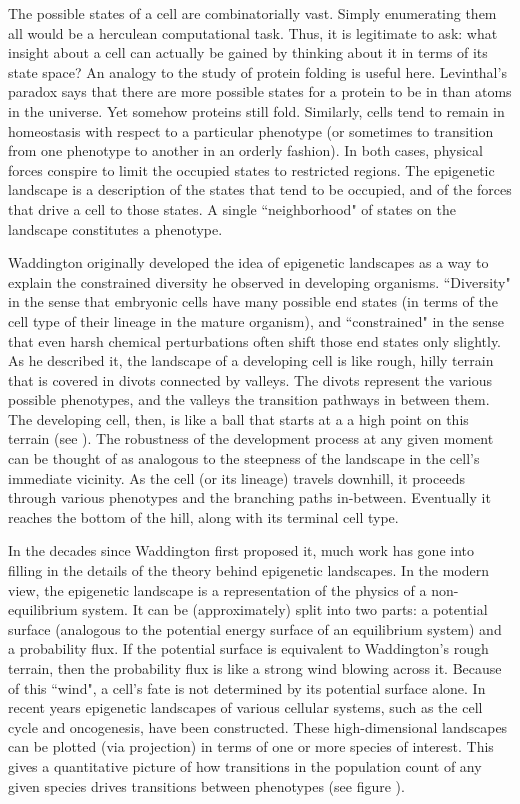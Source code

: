 The possible states of a cell are combinatorially vast. Simply enumerating them all would be a herculean computational task. Thus, it is legitimate to ask: what insight about a cell can actually be gained by thinking about it in terms of its state space? An analogy to the study of protein folding is useful here. Levinthal's paradox\cite{Levinthal:1969uy} says that there are more possible states for a protein to be in than atoms in the universe. Yet somehow proteins still fold. Similarly, cells tend to remain in homeostasis with respect to a particular phenotype (or sometimes to transition from one phenotype to another in an orderly fashion). In both cases, physical forces conspire to limit the occupied states to restricted regions. The epigenetic landscape is a description of the states that tend to be occupied, and of the forces that drive a cell to those states. A single ``neighborhood" of states on the landscape constitutes a phenotype.

Waddington originally developed the idea of epigenetic landscapes as a way to explain the constrained diversity he observed in developing organisms. ``Diversity" in the sense that embryonic cells have many possible end states (in terms of the cell type of their lineage in the mature organism), and ``constrained" in the sense that even harsh chemical perturbations often shift those end states only slightly. As he described it, the landscape of a developing cell is like rough, hilly terrain that is covered in divots connected by valleys. The divots represent the various possible phenotypes, and the valleys the transition pathways in between them. The developing cell, then, is like a ball that starts at a a high point on this terrain (see ). The robustness of the development process at any given moment can be thought of as analogous to the steepness of the landscape in the cell's immediate vicinity. As the cell (or its lineage) travels downhill, it proceeds through various phenotypes and the branching paths in-between. Eventually it reaches the bottom of the hill, along with its terminal cell type.

In the decades since Waddington first proposed it, much work has gone into filling in the details of the theory behind epigenetic landscapes. In the modern view\cite{Xu:2016dw,Wu:2014gf,Wu:2013dx}, the epigenetic landscape is a representation of the physics of a non-equilibrium system. It can be (approximately) split into two parts: a potential surface (analogous to the potential energy surface of an equilibrium system) and a probability flux. If the potential surface is equivalent to Waddington's rough terrain, then the probability flux is like a strong wind blowing across it. Because of this ``wind", a cell's fate is not determined by its potential surface alone. In recent years epigenetic landscapes of various cellular systems, such as the cell cycle\cite{Li:2014iw,Luo:2017iw} and oncogenesis\cite{Li:2014ho,ArandaAnzaldo:2018bf}, have been constructed. These high-dimensional landscapes can be plotted (via projection) in terms of one or more species of interest. This gives a quantitative picture of how transitions in the population count of any given species drives transitions between phenotypes (see figure ).

